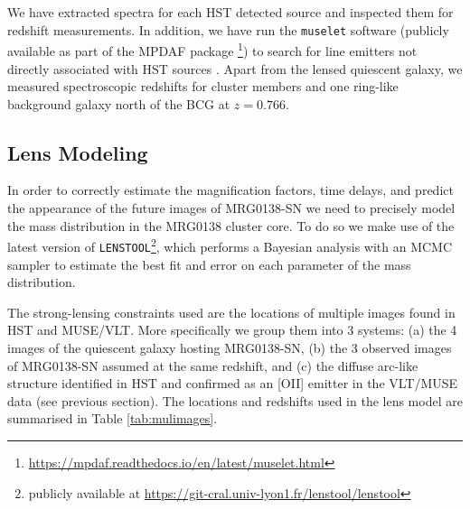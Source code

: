 \documentclass[12pt,dvipsnames]{article}
\def\lenstool{{\tt LENSTOOL}\xspace}
\begin{document}
We have extracted spectra for each HST detected source and inspected them for redshift measurements. In addition, we have run the {\tt muselet} software (publicly available as part of the MPDAF package \cite{piqueras_mpdaf_2019}\footnote{\url{https://mpdaf.readthedocs.io/en/latest/muselet.html}}) to search for line emitters not directly associated with HST sources \cite{mahler_strong_2018,lagattuta_probing_2019}. Apart from the lensed quiescent galaxy, we measured spectroscopic redshifts for cluster members and one ring-like background galaxy north of the BCG at $z=0.766$.

\subsection*{Lens Modeling}

In order to correctly estimate the magnification factors, time delays, and predict the appearance of the future images of MRG0138-SN we need to precisely model the mass distribution in the MRG0138 cluster core. To do so we make use of the latest version of \lenstool \cite{jullo_bayesian_2007}\footnote{publicly available at \url{ https://git-cral.univ-lyon1.fr/lenstool/lenstool}}, which performs a Bayesian analysis with an MCMC sampler to estimate the best fit and error on each parameter of the mass distribution. 

The strong-lensing constraints used are the locations of multiple images found in HST and MUSE/VLT. More specifically we group them into 3 systems: (a) the 4 images of the quiescent galaxy hosting MRG0138-SN, (b) the 3 observed images of MRG0138-SN assumed at the same redshift, and (c) the diffuse arc-like structure identified in HST and confirmed as an [OII] emitter in the VLT/MUSE data (see previous section). The locations and redshifts used in the lens model are summarised in Table \ref{tab:mulimages}.
\end{document}
